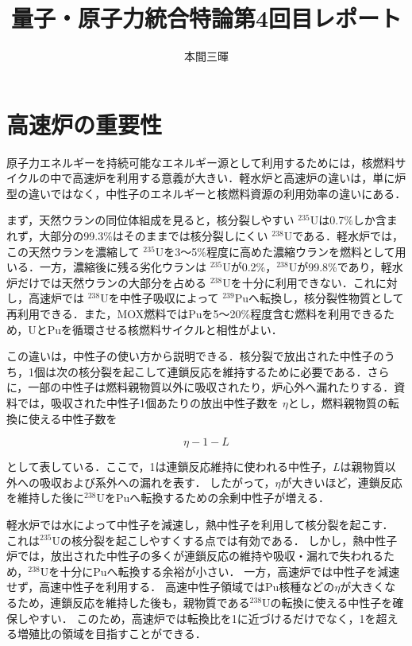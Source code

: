 \documentclass[titlepage,a4paper]{jsarticle}
\title{量子・原子力統合特論第4回目レポート}
\author{本間三暉}
\begin{document}
\maketitle

\section*{高速炉の重要性}

原子力エネルギーを持続可能なエネルギー源として利用するためには，核燃料サイクルの中で高速炉を利用する意義が大きい．軽水炉と高速炉の違いは，単に炉型の違いではなく，中性子のエネルギーと核燃料資源の利用効率の違いにある．

まず，天然ウランの同位体組成を見ると，核分裂しやすい
\(^{235}\mathrm{U}\)は0.7\%しか含まれず，大部分の99.3\%はそのままでは核分裂しにくい
\(^{238}\mathrm{U}\)である．軽水炉では，この天然ウランを濃縮して
\(^{235}\mathrm{U}\)を3〜5\%程度に高めた濃縮ウランを燃料として用いる．一方，濃縮後に残る劣化ウランは
\(^{235}\mathrm{U}\)が0.2\%，\(^{238}\mathrm{U}\)が99.8\%であり，軽水炉だけでは天然ウランの大部分を占める
\(^{238}\mathrm{U}\)を十分に利用できない．これに対し，高速炉では
\(^{238}\mathrm{U}\)を中性子吸収によって
\(^{239}\mathrm{Pu}\)へ転換し，核分裂性物質として再利用できる．また，MOX燃料ではPuを5〜20\%程度含む燃料を利用できるため，UとPuを循環させる核燃料サイクルと相性がよい．

この違いは，中性子の使い方から説明できる．核分裂で放出された中性子のうち，1個は次の核分裂を起こして連鎖反応を維持するために必要である．さらに，一部の中性子は燃料親物質以外に吸収されたり，炉心外へ漏れたりする．資料では，吸収された中性子1個あたりの放出中性子数を
\(\eta\)とし，燃料親物質の転換に使える中性子数を

\[
\eta - 1 - L
\]

として表している．ここで，1は連鎖反応維持に使われる中性子，\(L\)は親物質以外への吸収および系外への漏れを表す．
したがって，\(\eta\)が大きいほど，連鎖反応を維持した後に\(^{238}\mathrm{U}\)をPuへ転換するための余剰中性子が増える．

軽水炉では水によって中性子を減速し，熱中性子を利用して核分裂を起こす．
これは\(^{235}\mathrm{U}\)の核分裂を起こしやすくする点では有効である．
しかし，熱中性子炉では，放出された中性子の多くが連鎖反応の維持や吸収・漏れで失われるため，\(^{238}\mathrm{U}\)を十分にPuへ転換する余裕が小さい．
一方，高速炉では中性子を減速せず，高速中性子を利用する．
高速中性子領域ではPu核種などの\(\eta\)が大きくなるため，連鎖反応を維持した後も，親物質である\(^{238}\mathrm{U}\)の転換に使える中性子を確保しやすい．
このため，高速炉では転換比を1に近づけるだけでなく，1を超える増殖比の領域を目指すことができる．
\end{document}
